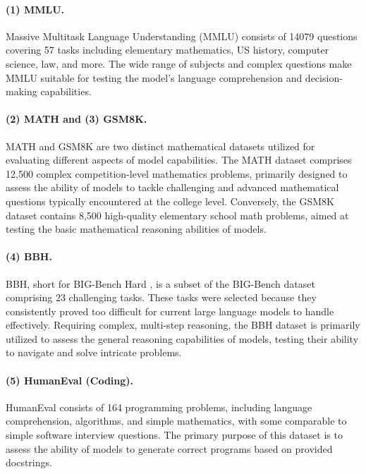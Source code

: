 \documentclass[11pt]{article}
\begin{document}
\paragraph{(1) MMLU.} 
Massive Multitask Language Understanding (MMLU) \cite{hendrycks2020measuring} consists of 14079 questions covering 57 tasks including elementary mathematics, US history, computer science, law, and more. The wide range of subjects and complex questions make MMLU suitable for testing the model's language comprehension and decision-making capabilities.


\paragraph{(2) MATH and (3) GSM8K.}
MATH \cite{hendrycks2021measuring} and GSM8K \cite{cobbe2021training} are two distinct mathematical datasets utilized for evaluating different aspects of model capabilities. The MATH \cite{hendrycks2021measuring} dataset comprises 12,500 complex competition-level mathematics problems, primarily designed to assess the ability of models to tackle challenging and advanced mathematical questions typically encountered at the college level. Conversely, the GSM8K \cite{cobbe2021training} dataset contains 8,500 high-quality elementary school math problems, aimed at testing the basic mathematical reasoning abilities of models.



\paragraph{(4) BBH.}
BBH, short for BIG-Bench Hard \cite{suzgun2022challenging}, is a subset of the BIG-Bench \cite{srivastava2022beyond} dataset comprising 23 challenging tasks. These tasks were selected because they consistently proved too difficult for current large language models to handle effectively. Requiring complex, multi-step reasoning, the BBH dataset is primarily utilized to assess the general reasoning capabilities of models, testing their ability to navigate and solve intricate problems.

\paragraph{(5) HumanEval (Coding).}
HumanEval \cite{chen2021evaluating} consists of 164 programming problems, including language comprehension, algorithms, and simple mathematics, with some comparable to simple software interview questions. 
The primary purpose of this dataset is to assess the ability of models to generate correct programs based on provided docstrings.
\end{document}

